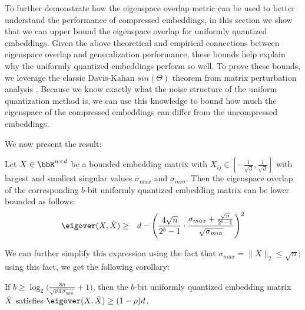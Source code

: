



















To further demonstrate how the eigenspace overlap metric can be used to better understand the performance of compressed embeddings, in this section we show that we can upper bound the eigenspace overlap for uniformly quantized embeddings.
Given the above theoretical and empirical connections between eigenspace overlap and generalization performance, these bounds help explain why the uniformly quantized embeddings perform so well.
To prove these bounds, we leverage the classic Davis-Kahan $sin(\Theta)$ theorem from matrix perturbation analysis \citep{sintheta70}.
Because we know exactly what the noise structure of the uniform quantization method is, we can use this knowledge to bound how much the eigenspace of the compressed embeddings can differ from the uncompressed embeddings.

We now present the result:
\begin{theorem}
	Let $X \in \RR^{n\times d}$ be a bounded embedding matrix with $X_{ij} \in [-\frac{1}{\sqrt{d}},\frac{1}{\sqrt{d}}]$ with largest and smallest singular values $\sigma_{max}$ and $\sigma_{min}$.
	Then the eigenspace overlap of the corresponding $b$-bit uniformly quantized embedding matrix can be lower bounded as follows:
	\begin{eqnarray*}
		\eigover(X,\tX) &\geq& d - \Bigg(\frac{4\sqrt{n}}{2^b-1} \cdot \frac{\sigma_{max} + \frac{\sqrt{n}}{2^b-1} }{\sqrt{\sigma_{min}}} \Bigg)^2
	\end{eqnarray*}
\end{theorem}
We can further simplify this expression using the fact that $\sigma_{max} = \|X\|_2 \leq \sqrt{n}$; using this fact, we get the following corollary:
\begin{corollary}
If $b \geq \log_2\bigg(\frac{8n}{\sqrt{\rho \, d\, \sigma_{min}}} + 1\bigg)$, then the $b$-bit uniformly quantized embedding matrix $\tX$ satisfies $\eigover(X,\tX) \geq (1-\rho)d$.
\end{corollary}


